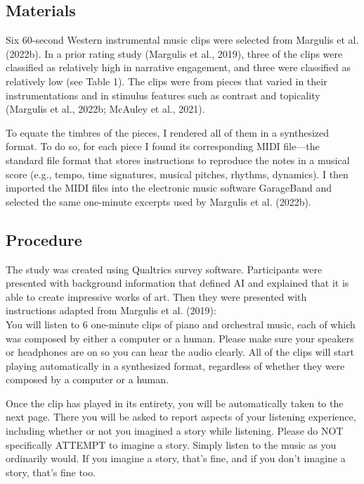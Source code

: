 \documentclass[12pt,twoside]{reedthesis}
\begin{document}
\subsection*{Materials}
Six 60-second Western instrumental music clips were selected from Margulis et al. (2022b). In a prior rating study (Margulis et al., 2019), three of the clips were classified as relatively high in narrative engagement, and three were classified as relatively low (see Table 1). The clips were from pieces that varied in their instrumentations and in stimulus features such as contrast and topicality (Margulis et al., 2022b; McAuley et al., 2021).

To equate the timbres of the pieces, I rendered all of them in a synthesized format. To do so, for each piece I found its corresponding MIDI file—the standard file format that stores instructions to reproduce the notes in a musical score (e.g., tempo, time signatures, musical pitches, rhythms, dynamics). I then imported the MIDI files into the electronic music software GarageBand and selected the same one-minute excerpts used by Margulis et al. (2022b).

\subsection*{Procedure}

The study was created using Qualtrics survey software. Participants were presented with background information that defined AI and explained that it is able to create impressive works of art. Then they were presented with instructions adapted from Margulis et al. (2019):
\\ 

You will listen to 6 one-minute clips of piano and orchestral music, each of which was composed by either a computer or a human. Please make sure your speakers or headphones are on so you can hear the audio clearly. All of the clips will start playing automatically in a synthesized format, regardless of whether they were composed by a computer or a human.

Once the clip has played in its entirety, you will be automatically taken to the next page. There you will be asked to report aspects of your listening experience, including whether or not you imagined a story while listening. Please do NOT specifically ATTEMPT to imagine a story. Simply listen to the music as you ordinarily would. If you imagine a story, that’s fine, and if you don’t imagine a story, that’s fine too.
\\
\end{document}
